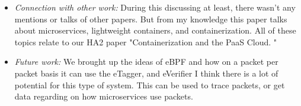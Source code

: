 \documentclass[letterpaper,twocolumn,10pt]{article}
\begin{document}
\begin{itemize}
\item {\it Connection with other work:} 
During this discussing at least, there wasn't any mentions or talks of other papers. But from my knowledge this paper
talks about microservices, lightweight containers, and containerization. All of these topics relate to our HA2 paper "Containerization 
and the PaaS Cloud. " 

\item {\it Future work:} 
We brought up the ideas of eBPF and how on a packet per packet basis it can use the eTagger, and eVerifier
I think there is a lot of potential for this type of system. This can be used to trace packets, or get data regarding 
on how microservices use packets. 

\end{itemize}
\end{document}
